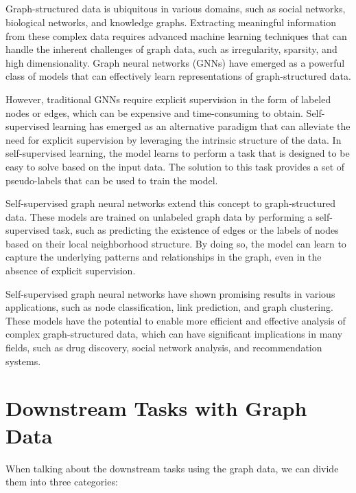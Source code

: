 \documentclass[a4paper,11pt]{report}
\begin{document}
\paragraph{}Graph-structured data is ubiquitous in various domains, such as social networks, biological networks, and knowledge graphs. Extracting meaningful information from these complex data requires advanced machine learning techniques that can handle the inherent challenges of graph data, such as irregularity, sparsity, and high dimensionality. Graph neural networks (GNNs) have emerged as a powerful class of models that can effectively learn representations of graph-structured data.

However, traditional GNNs require explicit supervision in the form of labeled nodes or edges, which can be expensive and time-consuming to obtain. Self-supervised learning has emerged as an alternative paradigm that can alleviate the need for explicit supervision by leveraging the intrinsic structure of the data. In self-supervised learning, the model learns to perform a task that is designed to be easy to solve based on the input data. The solution to this task provides a set of pseudo-labels that can be used to train the model.

Self-supervised graph neural networks extend this concept to graph-structured data. These models are trained on unlabeled graph data by performing a self-supervised task, such as predicting the existence of edges or the labels of nodes based on their local neighborhood structure. By doing so, the model can learn to capture the underlying patterns and relationships in the graph, even in the absence of explicit supervision.

Self-supervised graph neural networks have shown promising results in various applications, such as node classification, link prediction, and graph clustering. These models have the potential to enable more efficient and effective analysis of complex graph-structured data, which can have significant implications in many fields, such as drug discovery, social network analysis, and recommendation systems.
  

  
\chapter{Downstream Tasks with Graph Data }

When talking about the downstream tasks using the graph data, we can divide them into three categories:  
\end{document}
